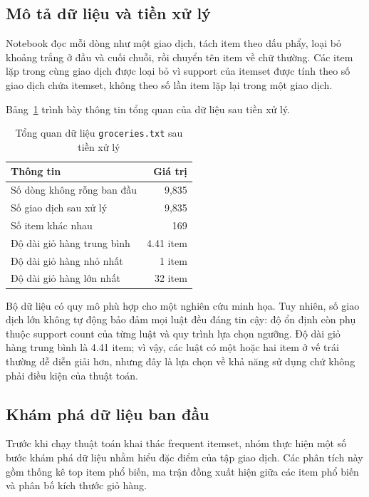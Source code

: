\subsection{Mô tả dữ liệu và tiền xử lý}
\label{subsec:application-data-preprocessing}

Notebook đọc mỗi dòng như một giao dịch, tách item theo dấu phẩy, loại bỏ
khoảng trắng ở đầu và cuối chuỗi, rồi chuyển tên item về chữ thường. Các item
lặp trong cùng giao dịch được loại bỏ vì support của itemset được tính theo số
giao dịch chứa itemset, không theo số lần item lặp lại trong một giao dịch.

Bảng~\ref{tab:application-data-summary} trình bày thông tin tổng quan của dữ liệu sau tiền xử lý.

\begin{table}[H]
\centering
\caption{Tổng quan dữ liệu \texttt{groceries.txt} sau tiền xử lý}
\label{tab:application-data-summary}
\begin{tabular}{lr}
\toprule
Thông tin & Giá trị \\
\midrule
Số dòng không rỗng ban đầu & 9,835 \\
Số giao dịch sau xử lý & 9,835 \\
Số item khác nhau & 169 \\
Độ dài giỏ hàng trung bình & 4.41 item \\
Độ dài giỏ hàng nhỏ nhất & 1 item \\
Độ dài giỏ hàng lớn nhất & 32 item \\
\bottomrule
\end{tabular}
\end{table}

Bộ dữ liệu có quy mô phù hợp cho một nghiên cứu minh họa. Tuy nhiên, số
giao dịch lớn không tự động bảo đảm mọi luật đều đáng tin cậy: độ ổn định còn
phụ thuộc support count của từng luật và quy trình lựa chọn ngưỡng. Độ dài giỏ
hàng trung bình là 4.41 item; vì vậy, các luật có một hoặc hai item ở vế trái
thường dễ diễn giải hơn, nhưng đây là lựa chọn về khả năng sử dụng chứ không
phải điều kiện của thuật toán.

\subsection{Khám phá dữ liệu ban đầu}
\label{subsec:application-eda}

Trước khi chạy thuật toán khai thác frequent itemset, nhóm thực hiện một số bước khám phá dữ liệu nhằm hiểu đặc điểm của tập giao dịch. Các phân tích này gồm thống kê top item phổ biến, ma trận đồng xuất hiện giữa các item phổ biến và phân bố kích thước giỏ hàng.

